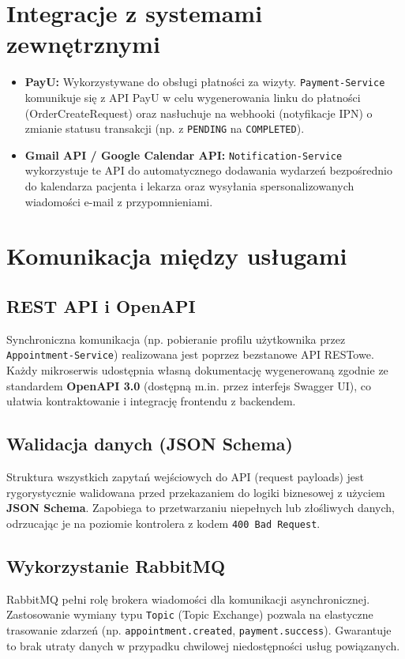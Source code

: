 \documentclass[12pt]{article}
\begin{document}
\section{Integracje z systemami zewnętrznymi}
\begin{itemize}
    \item \textbf{PayU:} Wykorzystywane do obsługi płatności za wizyty. \texttt{Payment-Service} komunikuje się z API PayU w celu wygenerowania linku do płatności (OrderCreateRequest) oraz nasłuchuje na webhooki (notyfikacje IPN) o zmianie statusu transakcji (np. z \texttt{PENDING} na \texttt{COMPLETED}).
    \item \textbf{Gmail API / Google Calendar API:} \texttt{Notification-Service} wykorzystuje te API do automatycznego dodawania wydarzeń bezpośrednio do kalendarza pacjenta i lekarza oraz wysyłania spersonalizowanych wiadomości e-mail z przypomnieniami.
\end{itemize}

\section{Komunikacja między usługami}
\subsection{REST API i OpenAPI}
Synchroniczna komunikacja (np. pobieranie profilu użytkownika przez \texttt{Appointment-Service}) realizowana jest poprzez bezstanowe API RESTowe. Każdy mikroserwis udostępnia własną dokumentację wygenerowaną zgodnie ze standardem \textbf{OpenAPI 3.0} (dostępną m.in. przez interfejs Swagger UI), co ułatwia kontraktowanie i integrację frontendu z backendem.

\subsection{Walidacja danych (JSON Schema)}
Struktura wszystkich zapytań wejściowych do API (request payloads) jest rygorystycznie walidowana przed przekazaniem do logiki biznesowej z użyciem \textbf{JSON Schema}. Zapobiega to przetwarzaniu niepełnych lub złośliwych danych, odrzucając je na poziomie kontrolera z kodem \texttt{400 Bad Request}.

\subsection{Wykorzystanie RabbitMQ}
RabbitMQ pełni rolę brokera wiadomości dla komunikacji asynchronicznej. Zastosowanie wymiany typu \texttt{Topic} (Topic Exchange) pozwala na elastyczne trasowanie zdarzeń (np. \texttt{appointment.created}, \texttt{payment.success}). Gwarantuje to brak utraty danych w przypadku chwilowej niedostępności usług powiązanych.
\end{document}
